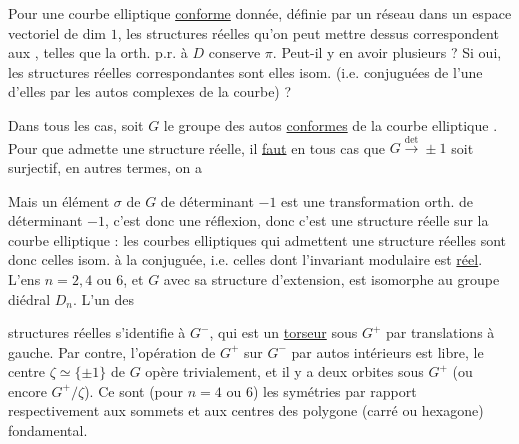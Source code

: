 Pour une courbe elliptique \uline{conforme} donnée, définie
par un réseau \inserted{$\pi$} dans un espace vectoriel  de dim $1$,
les structures réelles qu'on peut mettre dessus correspondent
aux , telles que la
 orth.
p.r. à $D$ conserve $\pi$. Peut-il y en avoir plusieurs ?
Si oui, les structures réelles correspondantes sont elles isom.
(i.e. conjuguées de l'une d'elles par les autos complexes
de la courbe) ? 

 Dans tous les cas, soit $G$ le groupe des autos
\uline{conformes} de la courbe elliptique .
Pour que  admette une structure réelle, il \uline{faut} en
tous cas que $G\overset{\mathrm{det}}\longrightarrow\pm1$ soit surjectif, en autres termes,
on a

Mais un élément $\sigma$ de $G$ de déterminant $-1$
est une transformation orth. de déterminant $-1$,
c'est donc une réflexion, donc c'est une structure
réelle sur la courbe elliptique : les courbes elliptiques
qui admettent une structure réelles sont donc celles
isom. à la conjuguée, i.e. celles dont l'invariant
modulaire est \uline{réel}. L'ens 
 $n=2,4$ ou $6$, et $G$ 
avec sa structure d'extension,
est isomorphe au groupe diédral $D_n$. L'un des

structures réelles s'identifie à $G^-$, qui est un \uline{torseur}
sous $G^+$ par translations à gauche. Par contre,
l'opération de $G^+$ sur $G^-$ par autos intérieurs est
 libre, le centre $\zeta\simeq\{\pm1\}$ de $G$ opère trivialement,
et il y a deux orbites sous $G^+$ (ou encore $G^+/\zeta$).
Ce sont (pour $n=4$ ou $6$) les symétries par rapport
 respectivement aux sommets et aux centres
des  polygone (carré ou hexagone) fondamental.

